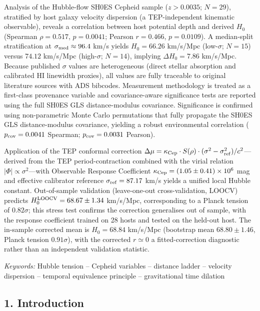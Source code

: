 \documentclass[
]{article}
\begin{document}
Analysis of the Hubble-flow SH0ES Cepheid sample (\(z > 0.0035\);
\(N=29\)), stratified by host galaxy velocity dispersion (a
TEP-independent kinematic observable), reveals a correlation between
host potential depth and derived \(H_0\) (Spearman \(\rho = 0.517\),
\(p = 0.0041\); Pearson \(r = 0.466\), \(p = 0.0109\)). A median-split
stratification at \(\sigma_{\rm med} \approx 96.4\) km/s yields
\(H_0 = 66.26\) km/s/Mpc (low-\(\sigma\); \(N=15\)) versus \(74.12\)
km/s/Mpc (high-\(\sigma\); \(N=14\)), implying \(\Delta H_0 = 7.86\)
km/s/Mpc. Because published \(\sigma\) values are heterogeneous (direct
stellar absorption and calibrated HI linewidth proxies), all values are
fully traceable to original literature sources with ADS bibcodes.
Measurement methodology is treated as a first-class provenance variable
and covariance-aware significance tests are reported using the full
SH0ES GLS distance-modulus covariance. Significance is confirmed using
non-parametric Monte Carlo permutations that fully propagate the SH0ES
GLS distance-modulus covariance, yielding a robust environmental
correlation (\(p_{\rm cov} = 0.0041\) Spearman; \(p_{\rm cov} = 0.0031\)
Pearson).

Application of the TEP conformal correction
\(\Delta\mu = \kappa_{\rm Cep}\cdot S(\rho)\cdot(\sigma^2-\sigma_{\rm ref}^2)/c^2\)---derived
from the TEP period-contraction combined with the virial relation
\(|\Phi|\propto\sigma^2\)---with Observable Response Coefficient
\(\kappa_{\rm Cep} = (1.05 \pm 0.41) \times 10^6\) mag and effective
calibrator reference \(\sigma_{\rm ref} = 87.17\) km/s yields a unified
local Hubble constant. Out-of-sample validation (leave-one-out
cross-validation, LOOCV) predicts \(H_0^{\rm LOOCV} = 68.67 \pm 1.34\)
km/s/Mpc, corresponding to a Planck tension of \(0.82\sigma\); this
stress test confirms the correction generalises out of sample, with the
response coefficient trained on 28 hosts and tested on the held-out
host. The in-sample corrected mean is \(H_0 = 68.84\) km/s/Mpc
(bootstrap mean \(68.80 \pm 1.46\), Planck tension \(0.91\sigma\)), with
the corrected \(r \simeq 0\) a fitted-correction diagnostic rather than
an independent validation statistic.

\emph{Keywords:} Hubble tension -- Cepheid variables -- distance ladder
-- velocity dispersion -- temporal equivalence principle --
gravitational time dilation

\subsection{1. Introduction}\label{introduction}
\end{document}
